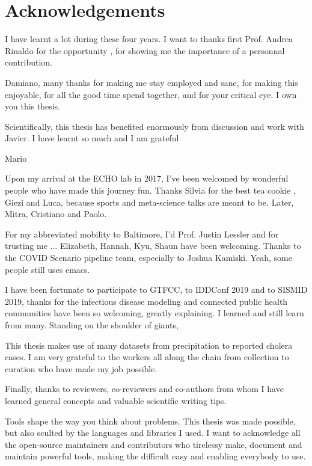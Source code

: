 


 \chapter{Acknowledgements}
 I have learnt a lot during these four years. I want to thanks first Prof. Andrea Rinaldo for the opportunity , for showing me the importance of a personnal contribution.  
 
 Damiano, many thanks for making me stay employed and sane, for making this enjoyable, for all the good time spend together, and for your critical eye. I own you this thesis.
 
 Scientifically, this thesis has benefited enormously from discussion and work with Javier. I have learnt so much and I am grateful
 
 Mario
 
 Upon my arrival at the ECHO lab in 2017, I've been welcomed by wonderful people who have made this journey fun. Thanks Silvia for the best tea cookie , Giezi and Luca, because sports and meta-science talks are meant to be. Later, Mitra, Cristiano and Paolo.
 
 
 For my abbreviated mobility to Baltimore, I'd Prof. Justin Lessler and for trusting me  ... Elizabeth, Hannah, Kyu, Shaun have been welcoming. Thanks to the COVID Scenario pipeline team, especially to Joshua Kamiski. Yeah, some people still uses emacs.
 
 I have been fortunate to participate to GTFCC, to IDDConf 2019 and to SISMID 2019, thanks for the infectious disease modeling and connected public health communities have been so welcoming, greatly explaining. I learned and still learn from many. Standing on the shoulder of giants, 
 
 This thesis makes use of many datasets from precipitation to reported cholera cases. I am very grateful to the workers all along the chain from collection to curation who have made my job possible.
 
 Finally, thanks to reviewers, co-reviewers and co-authors from whom I have learned general concepts and valuable scientific writing tips.
 
Tools shape the way you think about problems. This thesis was made possible, but also sculted by the languages and libraries I used. I want to acknowledge all the open-source maintainers and contributors who tirelessy make, document and maintain powerful tools, making the difficult easy and enabling everybody to use.

